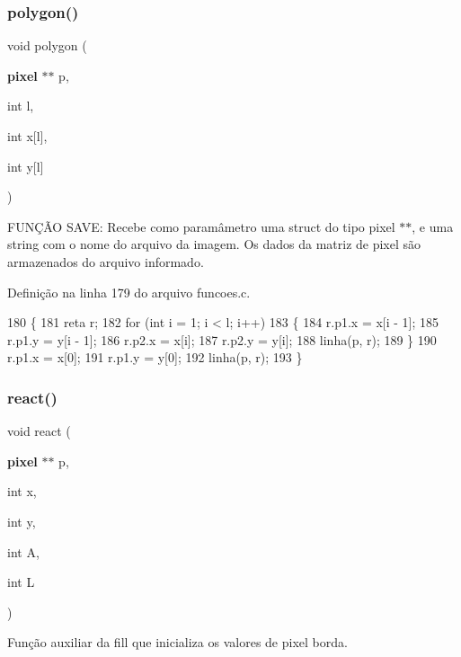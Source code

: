 \subsubsection{polygon()}
{\footnotesize\ttfamily void polygon (\begin{DoxyParamCaption}\item[{\textbf{ pixel} $\ast$$\ast$}]{p,  }\item[{int}]{l,  }\item[{int}]{x[l],  }\item[{int}]{y[l] }\end{DoxyParamCaption})}



F\+U\+NÇÃO S\+A\+VE\+: Recebe como paramâmetro uma struct do tipo pixel $\ast$$\ast$, e uma string com o nome do arquivo da imagem. Os dados da matriz de pixel são armazenados do arquivo informado. 



Definição na linha 179 do arquivo funcoes.\+c.


\begin{DoxyCode}
180 \{
181     reta r;
182     \textcolor{keywordflow}{for} (\textcolor{keywordtype}{int} i = 1; i < l; i++)
183     \{
184         r.p1.x = x[i - 1];
185         r.p1.y = y[i - 1];
186         r.p2.x = x[i];
187         r.p2.y = y[i];
188         linha(p, r);
189     \}
190     r.p1.x = x[0];
191     r.p1.y = y[0];
192     linha(p, r);
193 \}
\end{DoxyCode}
\mbox{\label{funcoes_8h_a5546e0ecd5fb5e9a56a2b3d0ff839bc3}} 
\subsubsection{react()}
{\footnotesize\ttfamily void react (\begin{DoxyParamCaption}\item[{\textbf{ pixel} $\ast$$\ast$}]{p,  }\item[{int}]{x,  }\item[{int}]{y,  }\item[{int}]{A,  }\item[{int}]{L }\end{DoxyParamCaption})}



Função auxiliar da fill que inicializa os valores de pixel borda. 

\mbox{\label{funcoes_8h_a5b9809578ece33b0228b217256e6487f}} 
